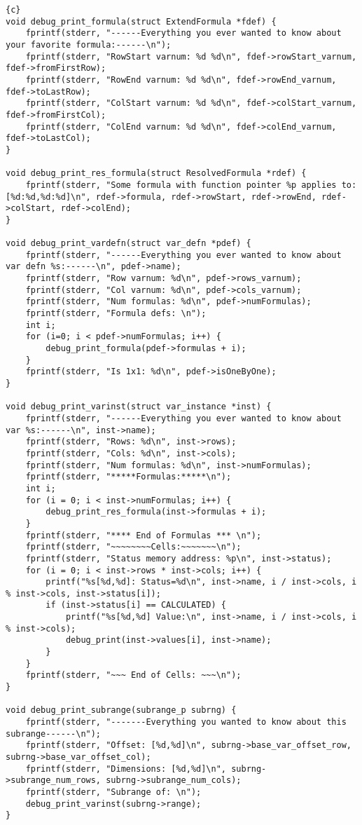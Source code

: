 \begin{lstlisting}{c}
void debug_print_formula(struct ExtendFormula *fdef) {
	fprintf(stderr, "------Everything you ever wanted to know about your favorite formula:------\n");
	fprintf(stderr, "RowStart varnum: %d %d\n", fdef->rowStart_varnum, fdef->fromFirstRow);
	fprintf(stderr, "RowEnd varnum: %d %d\n", fdef->rowEnd_varnum, fdef->toLastRow);
	fprintf(stderr, "ColStart varnum: %d %d\n", fdef->colStart_varnum, fdef->fromFirstCol);
	fprintf(stderr, "ColEnd varnum: %d %d\n", fdef->colEnd_varnum, fdef->toLastCol);
}

void debug_print_res_formula(struct ResolvedFormula *rdef) {
	fprintf(stderr, "Some formula with function pointer %p applies to: [%d:%d,%d:%d]\n", rdef->formula, rdef->rowStart, rdef->rowEnd, rdef->colStart, rdef->colEnd);
}

void debug_print_vardefn(struct var_defn *pdef) {
	fprintf(stderr, "------Everything you ever wanted to know about var defn %s:------\n", pdef->name);
	fprintf(stderr, "Row varnum: %d\n", pdef->rows_varnum);
	fprintf(stderr, "Col varnum: %d\n", pdef->cols_varnum);
	fprintf(stderr, "Num formulas: %d\n", pdef->numFormulas);
	fprintf(stderr, "Formula defs: \n");
	int i;
	for (i=0; i < pdef->numFormulas; i++) {
		debug_print_formula(pdef->formulas + i);
	}
	fprintf(stderr, "Is 1x1: %d\n", pdef->isOneByOne);
}

void debug_print_varinst(struct var_instance *inst) {
	fprintf(stderr, "------Everything you ever wanted to know about var %s:------\n", inst->name);
	fprintf(stderr, "Rows: %d\n", inst->rows);
	fprintf(stderr, "Cols: %d\n", inst->cols);
	fprintf(stderr, "Num formulas: %d\n", inst->numFormulas);
	fprintf(stderr, "*****Formulas:*****\n");
	int i;
	for (i = 0; i < inst->numFormulas; i++) {
		debug_print_res_formula(inst->formulas + i);
	}
	fprintf(stderr, "**** End of Formulas *** \n");
	fprintf(stderr, "~~~~~~~~Cells:~~~~~~~\n");
	fprintf(stderr, "Status memory address: %p\n", inst->status);
	for (i = 0; i < inst->rows * inst->cols; i++) {
		printf("%s[%d,%d]: Status=%d\n", inst->name, i / inst->cols, i % inst->cols, inst->status[i]);
		if (inst->status[i] == CALCULATED) {
			printf("%s[%d,%d] Value:\n", inst->name, i / inst->cols, i % inst->cols);
			debug_print(inst->values[i], inst->name);
		}
	}
	fprintf(stderr, "~~~ End of Cells: ~~~\n");
}

void debug_print_subrange(subrange_p subrng) {
	fprintf(stderr, "-------Everything you wanted to know about this subrange------\n");
	fprintf(stderr, "Offset: [%d,%d]\n", subrng->base_var_offset_row, subrng->base_var_offset_col);
	fprintf(stderr, "Dimensions: [%d,%d]\n", subrng->subrange_num_rows, subrng->subrange_num_cols);
	fprintf(stderr, "Subrange of: \n");
	debug_print_varinst(subrng->range);
}


\end{lstlisting}
